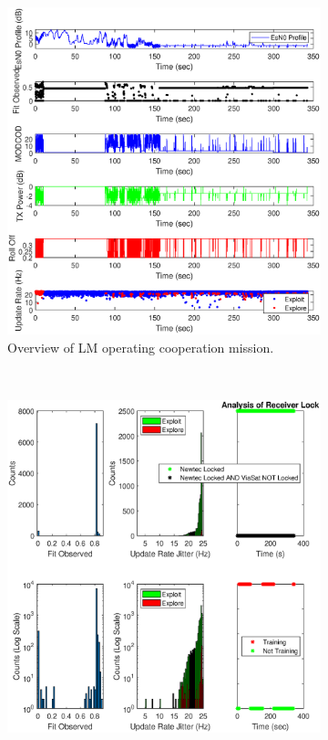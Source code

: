 \begin{figure}[ht]
\centering
\begin{subfigure}{\linewidth}
	\centering
	\includegraphics[scale=0.5]{figures/c_sim_results/sim22_LM_overview_coop.eps}
	\caption{Overview of LM operating cooperation mission.}
	\label{fig:cSimLMOverview}
\end{subfigure}\\
\begin{subfigure}{\linewidth}
	\centering
	\includegraphics[scale=0.5]{figures/c_sim_results/sim22_LM_hists_coop.eps}

\end{subfigure}
\end{figure}
